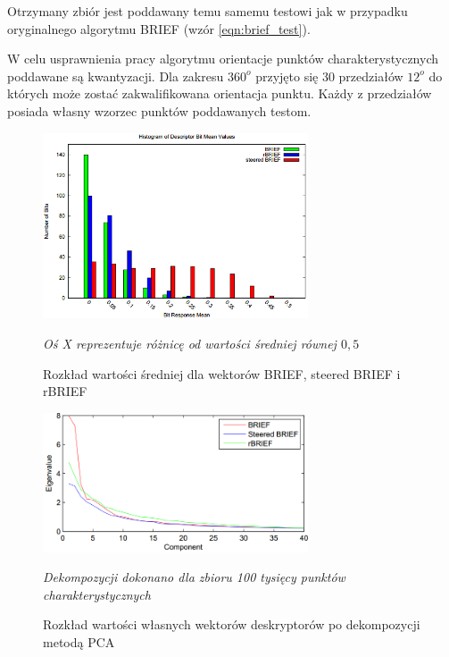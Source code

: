 Otrzymany zbiór jest poddawany temu samemu testowi jak w przypadku oryginalnego algorytmu BRIEF (wzór \ref{eqn:brief_test}).

W celu usprawnienia pracy algorytmu orientacje punktów charakterystycznych poddawane są kwantyzacji. Dla zakresu $360^o$ przyjęto się 30 przedziałów $12^o$ do których może zostać zakwalifikowana orientacja punktu. Każdy z przedziałów posiada własny wzorzec punktów poddawanych testom.


\begin{figure}
\centering
\includegraphics[width=0.7\textwidth]{pict/02/orb/orb_wykres_3.png}
\caption{Rozkład wartości średniej dla wektorów BRIEF, steered BRIEF i rBRIEF}
\textit{Oś X reprezentuje różnicę od wartości średniej równej $0,5$}
\label{fig:orb_wykres_3}
\end{figure}


\begin{figure}
\centering
\includegraphics[width=0.7\textwidth]{pict/02/orb/orb_wykres_4.png}
\caption{Rozkład wartości własnych wektorów deskryptorów po dekompozycji metodą PCA}
\textit{Dekompozycji dokonano dla zbioru 100 tysięcy punktów charakterystycznych}
\label{fig:orb_wykres_4}
\end{figure}

